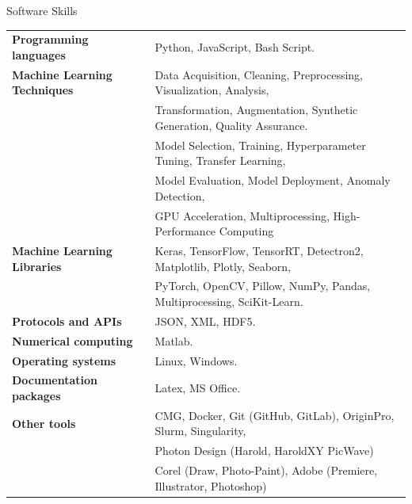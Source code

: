 \documentclass{resume} %
\begin{document}

    \begin{rSection}{Software Skills}
        \begin{tabular}{ @{} >{\bfseries}l @{\hspace{6ex}} l }

            Programming languages & {\normalfont Python, JavaScript, Bash Script.}\vspace{0.5em} \\
            
            Machine Learning Techniques & {\normalfont Data Acquisition, Cleaning, Preprocessing, Visualization, Analysis, }\\& {\normalfont Transformation, Augmentation, Synthetic Generation, Quality Assurance.} \\& {\normalfont Model Selection, Training, Hyperparameter Tuning, Transfer Learning, } \\& {\normalfont Model Evaluation, Model Deployment, Anomaly Detection, }\\& {\normalfont GPU Acceleration, Multiprocessing, High-Performance Computing}\vspace{0.5em} \\
            
            Machine Learning Libraries & {\normalfont Keras, TensorFlow, TensorRT, Detectron2, Matplotlib, Plotly, Seaborn,} \\& {\normalfont PyTorch, OpenCV, Pillow, NumPy, Pandas, Multiprocessing, SciKit-Learn.}\vspace{0.5em} \\
            
            Protocols and APIs & {\normalfont JSON, XML, HDF5.}\vspace{0.5em} \\
            
            Numerical computing & {\normalfont Matlab.}\vspace{0.5em} \\
            
            Operating systems & {\normalfont Linux, Windows.}\vspace{0.5em}\\
            
            Documentation packages & {\normalfont Latex, MS Office.}\vspace{0.5em}\\
            
            Other tools & {\normalfont CMG, Docker, Git (GitHub, GitLab), OriginPro, Slurm, Singularity, }
            \\& {\normalfont Photon Design (Harold, HaroldXY PicWave)}
            \\& {\normalfont Corel (Draw, Photo-Paint), Adobe (Premiere, Illustrator, Photoshop)}\vspace{0.5em}\\
        \end{tabular}
    \end{rSection}
    
\end{document}

